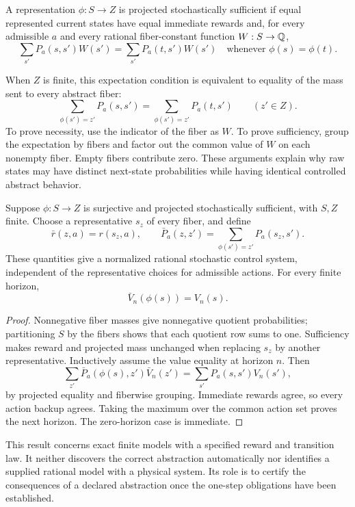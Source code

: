 \begin{definition}
A representation $\phi:S\to Z$ is projected stochastically sufficient if equal represented current states have equal immediate rewards and, for every admissible $a$ and every rational fiber-constant function $W:S\to\mathbb Q$,
\[
 \sum_{s'}P_a(s,s')W(s')=\sum_{s'}P_a(t,s')W(s')
 \quad\text{whenever }\phi(s)=\phi(t).
\]
\end{definition}

When $Z$ is finite, this expectation condition is equivalent to equality of the mass sent to every abstract fiber:
\[
 \sum_{\phi(s')=z'}P_a(s,s')=\sum_{\phi(s')=z'}P_a(t,s')\qquad(z'\in Z).
\]
To prove necessity, use the indicator of the fiber as $W$. To prove sufficiency, group the expectation by fibers and factor out the common value of $W$ on each nonempty fiber. Empty fibers contribute zero. These arguments explain why raw states may have distinct next-state probabilities while having identical controlled abstract behavior.

\begin{theorem}
Suppose $\phi:S\to Z$ is surjective and projected stochastically sufficient, with $S,Z$ finite. Choose a representative $s_z$ of every fiber, and define
\[
 \bar r(z,a)=r(s_z,a),\qquad
 \bar P_a(z,z')=\sum_{\phi(s')=z'}P_a(s_z,s').
\]
These quantities give a normalized rational stochastic control system, independent of the representative choices for admissible actions. For every finite horizon,
\[
 \bar V_n(\phi(s))=V_n(s).
\]
\end{theorem}
\begin{proof}
Nonnegative fiber masses give nonnegative quotient probabilities; partitioning $S$ by the fibers shows that each quotient row sums to one. Sufficiency makes reward and projected mass unchanged when replacing $s_z$ by another representative. Inductively assume the value equality at horizon $n$. Then
\[
 \sum_{z'}\bar P_a(\phi(s),z')\bar V_n(z')
 =\sum_{s'}P_a(s,s')V_n(s'),
\]
by projected equality and fiberwise grouping. Immediate rewards agree, so every action backup agrees. Taking the maximum over the common action set proves the next horizon. The zero-horizon case is immediate.
\end{proof}

This result concerns exact finite models with a specified reward and transition law. It neither discovers the correct abstraction automatically nor identifies a supplied rational model with a physical system. Its role is to certify the consequences of a declared abstraction once the one-step obligations have been established.

